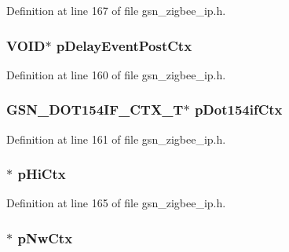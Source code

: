 Definition at line 167 of file gsn\_\-zigbee\_\-ip.h.

\hypertarget{a00438_afcc216c129528dccc51653661a14eaef}{
\subsubsection[{pDelayEventPostCtx}]{\setlength{\rightskip}{0pt plus 5cm}VOID$\ast$ {\bf pDelayEventPostCtx}}}
\label{a00438_afcc216c129528dccc51653661a14eaef}


Definition at line 160 of file gsn\_\-zigbee\_\-ip.h.

\hypertarget{a00438_a91d8d05dbfee6a1576323053fad49148}{
\subsubsection[{pDot154ifCtx}]{\setlength{\rightskip}{0pt plus 5cm}GSN\_\-DOT154IF\_\-CTX\_\-T$\ast$ {\bf pDot154ifCtx}}}
\label{a00438_a91d8d05dbfee6a1576323053fad49148}


Definition at line 161 of file gsn\_\-zigbee\_\-ip.h.

\hypertarget{a00438_ab671e23204d79f8fda7dba9992c3d6e9}{
\subsubsection[{pHiCtx}]{$\ast$ {\bf pHiCtx}}}
\label{a00438_ab671e23204d79f8fda7dba9992c3d6e9}


Definition at line 165 of file gsn\_\-zigbee\_\-ip.h.

\hypertarget{a00438_a4ab8e1b7273bd13fb04f9726ebf1d430}{
\subsubsection[{pNwCtx}]{$\ast$ {\bf pNwCtx}}}
\label{a00438_a4ab8e1b7273bd13fb04f9726ebf1d430}


